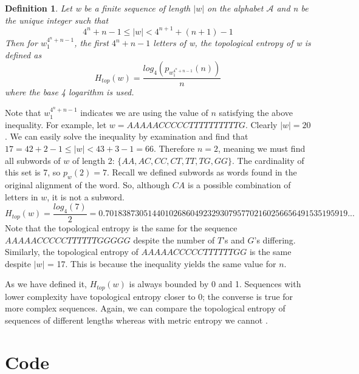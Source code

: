\documentclass{article}
\newtheorem{definition}{Definition}
\begin{document}
\begin{definition}
    Let w be a finite sequence of length $|w|$ on the alphabet $\mathcal{A}$ and n be the unique integer such that
    \begin{equation*}
        4^n + n - 1 \leq |w| < 4^{n + 1} + (n + 1) - 1
    \end{equation*}
    Then for $w_1^{4^n + n - 1}$, the first $4^n + n - 1$ letters of w, the topological entropy of w is defined as
    \begin{equation*}
        H_{top}(w) = \frac{log_4(p_{w_1^{4^n+n-1}}(n))}{n}
    \end{equation*}
    where the base 4 logarithm is used.
\end{definition}
\noindent Note that $w_1^{4^n + n - 1}$ indicates we are using the value of $n$ satisfying the above inequality.
For example, let $w = AAAAACCCCCTTTTTTTTTTG$.
Clearly $|w| = 20$.
We can easily solve the inequality by examination and find that $17 = 42 + 2 - 1 \leq |w| < 43 + 3 - 1 = 66$.
Therefore $n = 2$, meaning we must find all subwords of $w$ of length 2: $\{AA, AC, CC, CT, T T, T G, GG\}$.
The cardinality of this set is 7, so $p_w(2) = 7$.
Recall we defined subwords as words found in the original alignment of the word.
So, although $CA$ is a possible combination of letters in $w$, it is not a subword.
    \[H_{top}(w) = \frac{log_4(7)}{2} = 0.701838730514401026860492329307957702160256656491535195919...\]
Note that the topological entropy is the same for the sequence $AAAAACCCCCTTTTTTGGGGG$ despite the number of $T$'s and $G$'s differing.
Similarly, the topological entropy of $AAAAACCCCCTTTTTTGG$ is the same despite $|w|$ = 17.
This is because the inequality yields the same value for $n$.

As we have defined it, $H_{top}(w)$ is always bounded by 0 and 1.
Sequences with lower complexity have topological entropy closer to 0; the converse is true for more complex sequences.
Again, we can compare the topological entropy of sequences of different lengths whereas with metric entropy we cannot \cite{1}.

\section{Code}
\end{document}
